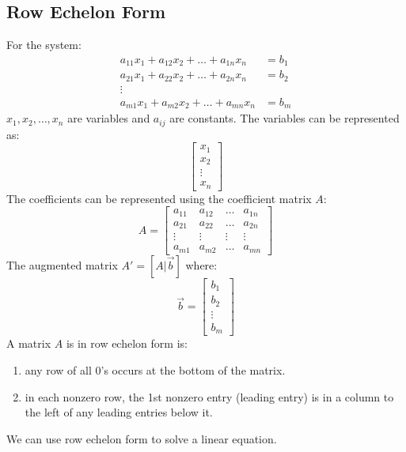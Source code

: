 \documentclass[letterpaper, 12pt]{math}
\begin{document}
\subsection*{Row Echelon Form}
For the system:
\begin{align*}
  a_{11}x_1+a_{12}x_2+\dots+a_{1n}x_n &= b_1 \\
  a_{21}x_1+a_{22}x_2+\dots+a_{2n}x_n &= b_2 \\
  \vdots \\
  a_{m1}x_1+a_{m2}x_2+\dots+a_{mn}x_n &= b_m
\end{align*}
\( x_1,x_2,\dots,x_n \) are variables and \( a_{ij} \) are constants. The
variables can be represented as:
\[ \begin{bmatrix} x_1 \\ x_2 \\ \vdots \\ x_n \end{bmatrix} \]
The coefficients can be represented using the coefficient matrix \( A \):
\[ A = \begin{bmatrix}
  a_{11} & a_{12} & \dots & a_{1n} \\
  a_{21} & a_{22} & \dots & a_{2n} \\
  \vdots & \vdots & \vdots & \vdots \\
  a_{m1} & a_{m2} & \dots & a_{mn}
\end{bmatrix} \]
The augmented matrix \( A' = [A|\vec{b}] \) where:
\[ \vec{b} = \begin{bmatrix} b_1 \\ b_2 \\ \vdots \\ b_m \end{bmatrix} \]
A matrix \( A \) is in row echelon form is:
\begin{enumerate}
  \item any row of all 0's occurs at the bottom of the matrix.
  \item in each nonzero row, the 1st nonzero entry (leading entry) is in a
    column to the left of any leading entries below it.
\end{enumerate}
We can use row echelon form to solve a linear equation.
\end{document}
